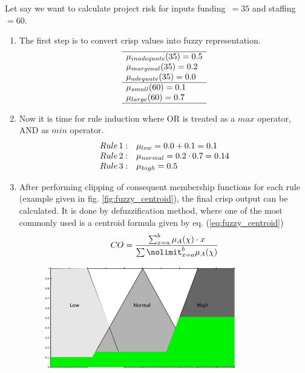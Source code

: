 Let say we want to calculate project risk for inputs funding~$=35$ and
staffing~$=60$. 
\begin{enumerate}
    \item The first step is to convert crisp values into fuzzy representation.
        $$
            \begin{array}[H]{l}
                \hline
                \mu_{inadequate}(35) = 0.5 \\
                \mu_{marginal}(35) = 0.2 \\
                \mu_{adequate}(35) = 0.0 \\ \hline
                \mu_{small}(60) = 0.1 \\
                \mu_{large}(60) = 0.7 \\ \hline
            \end{array}
        $$
    \item Now it is time for rule induction where OR is treated as a $max$ operator, AND
        as $min$ operator. 
        $$
            \begin{array}[H]{ll}
                Rule \,1: & \mu_{low} = 0.0 + 0.1 = 0.1 \\
                Rule \,2: & \mu_{normal} = 0.2\cdot 0.7 = 0.14 \\
                Rule \,3: & \mu_{high} = 0.5 \\
            \end{array}
        $$
    \item After performing clipping of consequent membership functions for each
        rule (example given in fig. \ref{fig:fuzzy_centroid}), the final crisp output can be calculated. It is done by
        defuzzification method, where one of the most commonly used is a centroid
        formula given by eq. (\ref{eq:fuzzy_centroid})
        \begin{equation}
            CO = \frac{\sum\nolimits_{x=a}^{b}\mu_A(\chi)\cdot
            x}{\sum\nolimit_{x=a}^{b}\mu_A(\chi)}
            \label{eq:fuzzy_centroid}
        \end{equation}
        \begin{figure}[H]
            \begin{center}
                \includegraphics[width=0.8\textwidth, height=0.5\textwidth]{fig/fuzzy_centroid.png}

\end{center}
\end{figure}
\end{enumerate}
